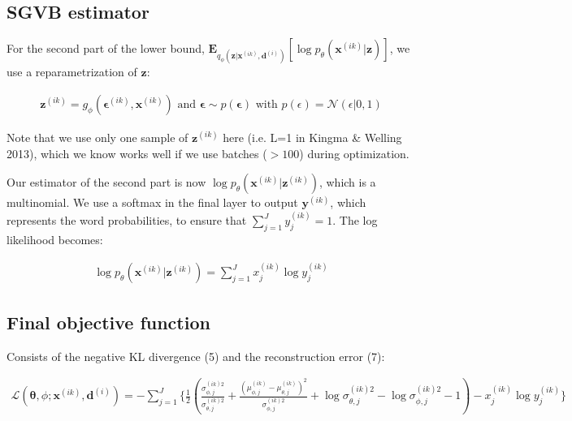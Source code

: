\documentclass{article}
\begin{document}
\subsection{SGVB estimator}

For the second part of the lower bound, $\mathbf{E}_{q_\phi(\mathbf{z}|\mathbf{x}^{(ik)},\mathbf{d}^{(i)})}[\log p_\theta (\mathbf{x}^{(ik)}|\mathbf{z})]$, we use a reparametrization of $\mathbf{z}$:

\begin{align} \mathbf{z}^{(ik)} = g_\phi(\mathbf{\epsilon}^{(ik)}, \mathbf{x}^{(ik)}) \text{    and    } \mathbf{\epsilon} 
 \sim p(\mathbf{\epsilon}) \text{   with  } p(\epsilon) = \mathcal{N}(\epsilon|0,1)
\end{align}

Note that we use only one sample of $\mathbf{z}^{(ik)}$ here (i.e. L=1 in Kingma \& Welling 2013), which we know works well if we use batches ($>100$) during optimization.

Our estimator of the second part is now $\log p_\theta (\mathbf{x}^{(ik)}|\mathbf{z}^{(ik)})$, which is a multinomial. We use a softmax in the final layer to output $\mathbf{y}^{(ik)}$, which represents the word probabilities, to ensure that $\sum\limits_{j=1}^J y_j^{(ik)} = 1$. The log likelihood becomes: 

\begin{align}
\log p_\theta (\mathbf{x}^{(ik)}|\mathbf{z}^(ik)) = \sum\limits_{j=1}^{J}x_j^{(ik)}\log y_j^{(ik)}
\end{align}

\subsection{Final objective function}

Consists of the negative KL divergence (5) and the reconstruction error (7):

\begin{align}
\mathcal{L}(\mathbf{\theta}, \phi; \mathbf{x}^{(ik)},
 \mathbf{d}^{(i)}) = - 
 \sum\limits_{j=1}^{J}\{\frac{1}{2}(
 \frac{\sigma_{\phi,j}^{(ik)2}}	{\sigma_{\theta,j}^{(ik)2}} 
 + \frac{(\mu_{\phi,j}^{(ik)} - \mu_{\theta,j}^{(ik)})^{2}}		{\sigma_{\phi,j}^{(ik)2}} 
 + \log  \sigma_{\theta,j}^{(ik)2} - \log \sigma_{\phi,j}^{(ik)2}
   - 1) - x_j^{(ik)}\log y_j^{(ik)} \}
\end{align}
\end{document}
